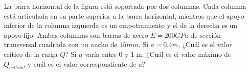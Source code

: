 %
%

%
%
%

%
%	
%	





\ejercicio

La barra horizontal de la figura está soportada por dos columnas. Cada columna está articulada en su parte superior a la barra horizontal, mientras que el apoyo inferior de la columna izquierda es un empotramiento y el de la derecha es un apoyo fijo. Ambas columnas son barras de acero $E=200GPa$ de sección transversal cuadrada con un ancho de $15 mm$.
\parte Si $a=0.4m$, ¿Cuál es el valor crítico de la carga $Q$?
\parte Si $a$ varía entre 0 y 1 m. ¿Cuál es el valor máximo de $Q_{critico}$, y cuál es el valor correspondiente de $a$?

